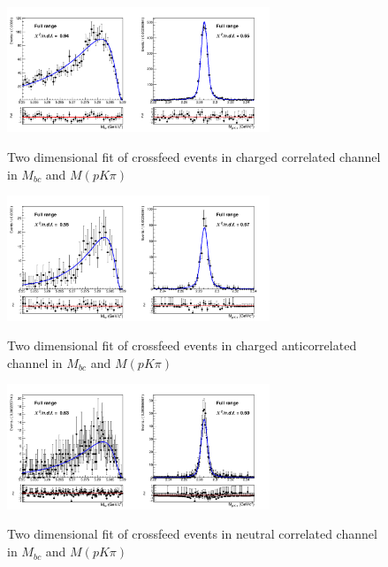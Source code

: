 \begin{figure}
\centering
{\includegraphics[width=0.7\textwidth]{04-SimultaneousFit/figs/streams01245_CrossfeedPeak_charged_corrLambdaC_2Dfit.png}}
\caption{Two dimensional fit of crossfeed events in charged correlated channel in $M_{bc}$  and $M(p K \pi)$ }
\label{fig:streams01245_CrossfeedPeak_charged_corrLambdaC_2Dfit}
\end{figure}


\begin{figure}
\centering
{\includegraphics[width=0.7\textwidth]{04-SimultaneousFit/figs/streams01234_CrossfeedPeak_charged_anticorr_LambdaC_2Dfit.png}}
\caption{Two dimensional fit of crossfeed events in charged anticorrelated channel in $M_{bc}$  and $M(p K \pi)$ }
\label{fig:streams01234_CrossfeedPeak_charged_anticorr_LambdaC_2Dfit}
\end{figure}

\begin{figure}
\centering
{\includegraphics[width=0.7\textwidth]{04-SimultaneousFit/figs/streams01234_CrossfeedPeak_neutral_corrLambdaC_2Dfit.png}}
\caption{Two dimensional fit of crossfeed events in neutral correlated channel in $M_{bc}$  and $M(p K \pi)$ }
\label{fig:streams01234_CrossfeedPeak_neutral_corrLambdaC_2Dfit}
\end{figure}

